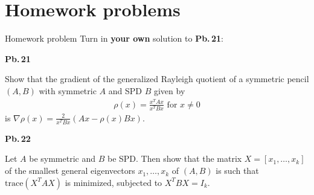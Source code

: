 \documentclass[t,usepdftitle=false]{beamer}
\begin{document}
\section{Homework problems}
\begin{frame}{Homework problem}\vspace{.1cm}
Turn in \textbf{your own} solution to \textbf{Pb.$\,$21}:\vspace{.15cm}\\
\begin{minipage}[t]{0.1\textwidth}
\textbf{Pb.$\,$21}
\end{minipage}
\begin{minipage}[t]{0.89\textwidth}
Show that the gradient of the generalized Rayleigh quotient of a symmetric pencil $(A,B)$ with symmetric $A$ and SPD $B$ given by
\begin{align*}
\rho(x)=\frac{x^TAx}{x^TBx}\text{ for }x\neq 0
\end{align*}
is $\nabla\rho(x)=\frac{2}{x^TBx}(Ax-\rho(x)Bx)$.
\end{minipage}\vspace{.15cm}

\begin{minipage}[t]{0.1\textwidth}
\textbf{Pb.$\,$22}
\end{minipage}
\begin{minipage}[t]{0.89\textwidth}
Let $A$ be symmetric and $B$ be SPD.
Then show that the matrix $X=[x_1,\dots,x_k]$ of the smallest general eigenvectors $x_1,\dots,x_k$ of $(A,B)$ is such that $\text{trace}(X^TAX)$ is minimized, subjected to $X^TBX=I_k$.
\end{minipage}

\end{frame}
\end{document}
